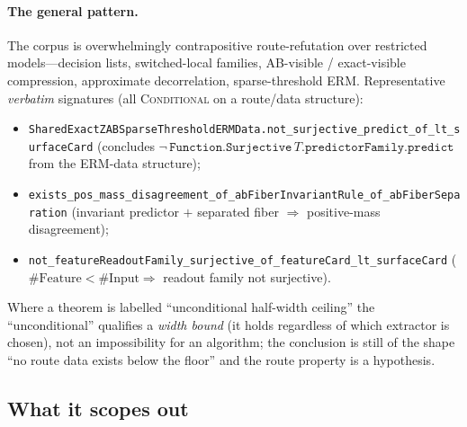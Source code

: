 \paragraph{The general pattern.}
The corpus is overwhelmingly contrapositive route-refutation over restricted
models---decision lists, switched-local families, AB-visible / exact-visible
compression, approximate decorrelation, sparse-threshold ERM. Representative
\emph{verbatim} signatures (all \textsc{Conditional} on a route/data structure):
\begin{itemize}
  \item \texttt{SharedExactZABSparseThresholdERMData.not\_surjective\_predict\_of\_lt\_surfaceCard}
  (concludes $\lnot\,\texttt{Function.Surjective}\,T.\texttt{predictorFamily.predict}$
  from the ERM-data structure);
  \item \texttt{exists\_pos\_mass\_disagreement\_of\_abFiberInvariantRule\_of\_abFiberSeparation}
  (invariant predictor $+$ separated fiber $\Rightarrow$ positive-mass
  disagreement);
  \item \texttt{not\_featureReadoutFamily\_surjective\_of\_featureCard\_lt\_surfaceCard}
  ($\#\text{Feature}<\#\text{Input} \Rightarrow$ readout family not surjective).
\end{itemize}
Where a theorem is labelled ``unconditional half-width ceiling'' the
``unconditional'' qualifies a \emph{width bound} (it holds regardless of which
extractor is chosen), not an impossibility for an algorithm; the conclusion is
still of the shape ``no route data exists below the floor'' and the route
property is a hypothesis.

\subsection{What it scopes out}
\label{sec:pnp-scopes}

